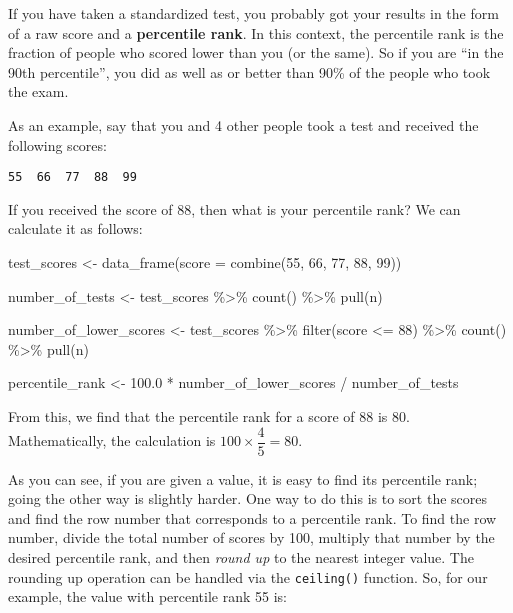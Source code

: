 \documentclass[
]{book}
\newenvironment{Shaded}{\begin{snugshade}}{\end{snugshade}}
\newcommand{\AttributeTok}[1]{\textcolor[rgb]{0.77,0.63,0.00}{#1}}
\newcommand{\DecValTok}[1]{\textcolor[rgb]{0.00,0.00,0.81}{#1}}
\newcommand{\FloatTok}[1]{\textcolor[rgb]{0.00,0.00,0.81}{#1}}
\newcommand{\FunctionTok}[1]{\textcolor[rgb]{0.00,0.00,0.00}{#1}}
\newcommand{\NormalTok}[1]{#1}
\newcommand{\OtherTok}[1]{\textcolor[rgb]{0.56,0.35,0.01}{#1}}
\newcommand{\SpecialCharTok}[1]{\textcolor[rgb]{0.00,0.00,0.00}{#1}}
\begin{document}
If you have taken a standardized test, you probably got your results in the form of a raw score and a \textbf{percentile rank}.
In this context, the percentile rank is the fraction of people who scored lower than you (or the same).
So if you are ``in the 90th percentile'', you did as well as or better than 90\% of the people who took the exam.

As an example, say that you and 4 other people took a test and received the following scores:

\begin{verbatim}
55  66  77  88  99
\end{verbatim}

If you received the score of 88, then what is your percentile rank?
We can calculate it as follows:

\begin{Shaded}
\begin{Highlighting}[]
\NormalTok{test\_scores }\OtherTok{\textless{}{-}} \FunctionTok{data\_frame}\NormalTok{(}\AttributeTok{score =} \FunctionTok{combine}\NormalTok{(}\DecValTok{55}\NormalTok{, }\DecValTok{66}\NormalTok{, }\DecValTok{77}\NormalTok{, }\DecValTok{88}\NormalTok{, }\DecValTok{99}\NormalTok{))}
  
\NormalTok{number\_of\_tests }\OtherTok{\textless{}{-}}\NormalTok{ test\_scores }\SpecialCharTok{\%\textgreater{}\%}
  \FunctionTok{count}\NormalTok{() }\SpecialCharTok{\%\textgreater{}\%}
  \FunctionTok{pull}\NormalTok{(n)}
  
\NormalTok{number\_of\_lower\_scores }\OtherTok{\textless{}{-}}\NormalTok{ test\_scores }\SpecialCharTok{\%\textgreater{}\%}
  \FunctionTok{filter}\NormalTok{(score }\SpecialCharTok{\textless{}=} \DecValTok{88}\NormalTok{) }\SpecialCharTok{\%\textgreater{}\%}
  \FunctionTok{count}\NormalTok{() }\SpecialCharTok{\%\textgreater{}\%}
  \FunctionTok{pull}\NormalTok{(n)}
  
\NormalTok{percentile\_rank }\OtherTok{\textless{}{-}} \FloatTok{100.0} \SpecialCharTok{*}\NormalTok{ number\_of\_lower\_scores }\SpecialCharTok{/}\NormalTok{ number\_of\_tests}
\end{Highlighting}
\end{Shaded}

From this, we find that the percentile rank for a score of 88 is 80.
Mathematically, the calculation is \(100 \times \dfrac{4}{5} = 80\).

As you can see, if you are given a value, it is easy to find its percentile rank; going the other way is slightly harder.
One way to do this is to sort the scores and find the row number that corresponds to a percentile rank.
To find the row number, divide the total number of scores by 100, multiply that number by the desired percentile rank, and then \emph{round up} to the nearest integer value.
The rounding up operation can be handled via the \texttt{ceiling()} function.
So, for our example, the value with percentile rank 55 is:
\end{document}
